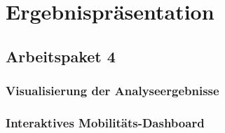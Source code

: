 \newpage
\section{Ergebnispräsentation} \label{infos}

\subsection{Arbeitspaket 4}
\subsubsection{Visualisierung der Analyseergebnisse}

\subsubsection{Interaktives Mobilitäts-Dashboard}
